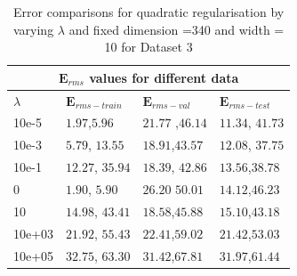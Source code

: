 {
\begin{table}[hptb]
\begin{tabular}{ |p{1.5cm}|p{3cm}|p{3cm}| p{3cm}|  }
\hline
\multicolumn{4}{|c|}{$\mathbf{E}_{rms}$ values for different data } \\
\hline
\rowcolor{lightgray} $\lambda$ & $\mathbf{E}_{rms-train}$ & $\mathbf{E}_{rms-val}$ & $\mathbf{E}_{rms-test}$ \\
\hline
  10e-5  &  $1.97$,$5.96$       &       $21.77$ ,$46.14$ & $11.34$, $41.73$  \\
 \hline
  10e-3  &   $5.79 $, $ 13.55$       &       $18.91$,$43.57$        &  $12.08$, $37.75$  \\
 \hline
  10e-1  &   $12.27$, $35.94$       &       $18.39$, $42.86$ & $13.56$,$38.78$  \\
 \hline
  0  &    $1.90$, $5.90$     &      $26.20$  $50.01 $         &     $14.12$,$46.23$ \\
  \hline
  10     &   $14.98$,  $43.41$   &        $18.58$,$45.88$         &     $15.10$,$43.18$     \\
  \hline
  10e+03   &   $21.92$, $55.43$    &         $22.41$,$59.02$      &      $21.42$,$53.03$        \\
  \hline
  10e+05  &    $32.75$, $63.30$  &         $31.42$,$67.81$       &        $31.97$,$61.44$      \\
\hline
\end{tabular}
\caption{Error comparisons for quadratic regularisation by varying $\lambda $  and fixed dimension =340 and width = 10 for Dataset 3}
\label{table:13}
\end{table}
}


